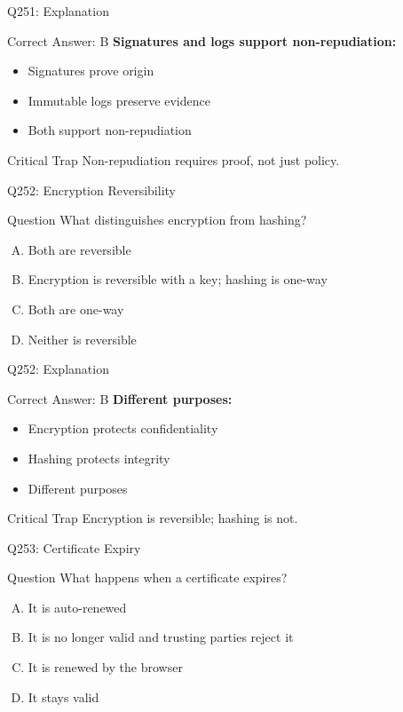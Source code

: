 \documentclass{beamer}
\begin{document}
	\begin{frame}{Q251: Explanation}
		\begin{block}{Correct Answer: B}
			\textbf{Signatures and logs support non-repudiation:}
			\begin{itemize}
				\item Signatures prove origin
				\item Immutable logs preserve evidence
				\item Both support non-repudiation
			\end{itemize}
		\end{block}
		\begin{alertblock}{Critical Trap}
			Non-repudiation requires proof, not just policy.
		\end{alertblock}
	\end{frame}
	
	\begin{frame}{Q252: Encryption Reversibility}
		\begin{block}{Question}
			What distinguishes encryption from hashing?
		\end{block}
		\begin{enumerate}[(A)]
			\item Both are reversible
			\item Encryption is reversible with a key; hashing is one-way
			\item Both are one-way
			\item Neither is reversible
		\end{enumerate}
	\end{frame}
	
	\begin{frame}{Q252: Explanation}
		\begin{block}{Correct Answer: B}
			\textbf{Different purposes:}
			\begin{itemize}
				\item Encryption protects confidentiality
				\item Hashing protects integrity
				\item Different purposes
			\end{itemize}
		\end{block}
		\begin{alertblock}{Critical Trap}
			Encryption is reversible; hashing is not.
		\end{alertblock}
	\end{frame}
	
	\begin{frame}{Q253: Certificate Expiry}
		\begin{block}{Question}
			What happens when a certificate expires?
		\end{block}
		\begin{enumerate}[(A)]
			\item It is auto-renewed
			\item It is no longer valid and trusting parties reject it
			\item It is renewed by the browser
			\item It stays valid
		\end{enumerate}
	\end{frame}
	
\end{document}
